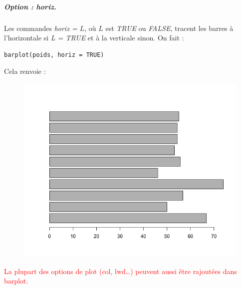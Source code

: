 \subparagraph{Option : horiz.}
Les commandes \textit{horiz = $L$}, où $L$ est \textit{TRUE} ou \textit{FALSE}, tracent les barres à l'horizontale si \textit{L = TRUE} et à la verticale sinon.\newline
On fait :
\begin{lstlisting}[language=html]
barplot(poids, horiz = TRUE)
\end{lstlisting}
Cela renvoie :
\begin{figure}[H]\begin{center}\includegraphics[scale=0.4]{ilu/gra40.png}\end{center}\end{figure}
\textcolor{red}{La plupart des options de plot (col, lwd\dots ) peuvent aussi être rajoutées dans barplot.}
